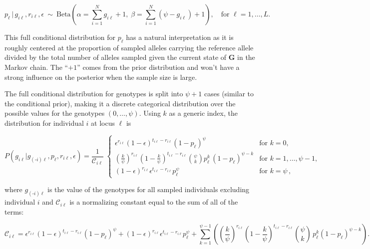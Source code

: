 \documentclass[11pt,english,letterpaper,oneside]{article}
\begin{document}
\begin{equation}\label{p-full}
p_{\ell}\,|\,g_{i \ell},r_{i \ell},\epsilon \: \sim \: \text{Beta}\left(\alpha= \sum_{i=1}^N g_{i \ell} +1,\; \beta = \sum_{i=1}^N (\psi-g_{i \ell})+1\right),\quad \text{for } \ell = 1,\ldots,L.
\end{equation}

\noindent This full conditional distribution for $p_{\ell}$ has a natural interpretation as it is roughly centered at the proportion of sampled alleles carrying the reference allele divided by the total number of alleles sampled given the current state of $\bm{G}$ in the Markov chain. The ``$+1$'' comes from the prior distribution and won't have a strong influence on the posterior when the sample size is large.
\medskip

The full conditional distribution for genotypes is split into $\psi+1$ cases (similar to the conditional prior), making it a discrete categorical distribution over the possible values for the genotypes $(0,\ldots,\psi)$. Using $k$ as a generic index, the distribution for individual $i$ at locus $\ell$ is

\begin{equation}\label{G-full}
P(g_{i \ell}|g_{(\text{-}i) \ell},p_{\ell},r_{i \ell},\epsilon) = \frac{1}{\mathcal{C}_{i \ell}} \;
	\begin{cases}
	\epsilon^{r_{i \ell}}(1-\epsilon)^{t_{i \ell}-r_{i \ell}}(1-p_{\ell})^\psi & \text{for  } k = 0, \\[0.05in]
	\left(\frac{k}{\psi}\right)^{r_{i \ell}}\left(1-\frac{k}{\psi}\right)^{t_{i \ell}-r_{i \ell}}\displaystyle\binom{\psi}{k}p_{\ell}^{k}\,(1-p_{\ell})^{\psi-k} & \text{for  } k = 1,\ldots,\psi-1, \\[0.05in]
	(1-\epsilon)^{r_{i \ell}}\epsilon^{t_{i \ell}-r_{i \ell}}p_{\ell}^\psi & \text{for  } k = \psi\,,
	\end{cases} 
\end{equation}

\noindent where $g_{(\text{-}i) \ell}$ is the value of the genotypes for all sampled individuals excluding individual $i$ and $\mathcal{C}_{i \ell}$ is a normalizing constant equal to the sum of all of the terms:

\begin{equation*}
\mathcal{C}_{i \ell} = \epsilon^{r_{i \ell}}(1-\epsilon)^{t_{i \ell}-r_{i \ell}}(1-p_{\ell})^\psi + (1-\epsilon)^{r_{i \ell}}\epsilon^{t_{i \ell}-r_{i \ell}}p_{\ell}^\psi + \sum_{k=1}^{\psi-1}\left(\left(\frac{k}{\psi}\right)^{r_{i \ell}}\left(1-\frac{k}{\psi}\right)^{t_{i \ell}-r_{i \ell}}\binom{\psi}{k}\,p_{\ell}^k(1-p_{\ell})^{\psi-k}\right).
\end{equation*}
\end{document}
